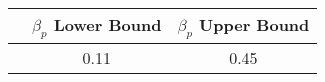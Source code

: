\begin{table}[ht]
\centering
\begin{tabular}{ccc}
  \hline
 & $\beta_p$ Lower Bound & $\beta_p$ Upper Bound \\ 
  \hline
 & 0.11 & 0.45 \\ 
   \hline
\end{tabular}
\end{table}
